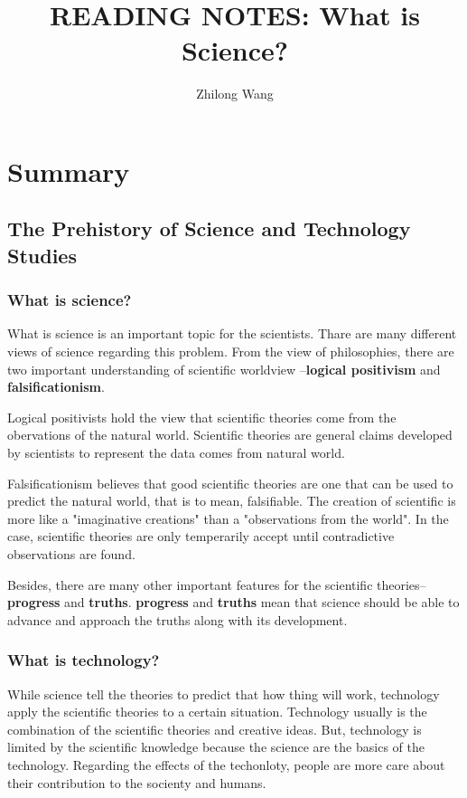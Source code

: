 \documentclass[18pt]{article}
\begin{document}
 
 
\title{READING NOTES: What is Science?}
\author{Zhilong Wang}

\maketitle
\section{Summary}
\subsection{The Prehistory of Science and Technology Studies}
\subsubsection{What is science?}
What is science is an important topic for the scientists. 
Thare are many different views of science regarding this problem.
From the view of philosophies, there are two important understanding of scientific worldview
--\textbf{logical positivism} and \textbf{falsificationism}. 

Logical positivists hold the view that scientific theories come from the obervations of the natural world\cite{ayer2012language,richardson1998carnap}.
Scientific theories are general claims developed by scientists to represent the data comes from natural world.

Falsificationism believes that good scientific theories are one that can be used to predict the natural world, that is to mean, falsifiable.
The creation of scientific is more like a "imaginative creations" than a "observations from the world".
In the case, scientific theories are only temperarily accept until contradictive observations are found.

Besides, there are many other important features for the scientific theories--\textbf{progress} and \textbf{truths}.
\textbf{progress} and \textbf{truths} mean that science should be able to advance and approach the truths along with its development.

\subsubsection{What is technology?}
While science tell the theories to predict that how thing will work, 
technology apply the scientific theories to a certain situation.
Technology usually is the combination of the scientific theories and creative ideas\cite{sismondo2010introduction}.
But, technology is limited by the scientific knowledge because the science are the basics of the technology. 
Regarding the effects of the techonloty, people are more care about their contribution to the socienty and humans.
\end{document}
